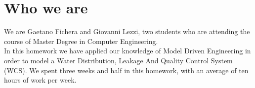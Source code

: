 \newpage \chapter{\textbf{Who we are}}
We are Gaetano Fichera and Giovanni Lezzi, two students who are attending the course of Master Degree in Computer Engineering.
\\In this homework we have applied our knowledge of Model Driven Engineering in order to model a Water Distribution, Leakage And Quality Control System (WCS). We spent three weeks and half in this homework, with an average of ten hours of work per week.

